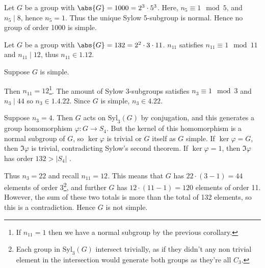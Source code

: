 \begin{example}
	Let $G$ be a group with $\abs{G} = 1000 = 2^3 \cdot 5^3$.
	Here, $n_5 \equiv 1 \mod 5$, and $n_5 \mid 8$, hence $n_5 = 1$.
	Thus the unique Sylow 5-subgroup is normal.
	Hence no group of order 1000 is simple.
\end{example}

\begin{example}
	Let $G$ be a group with $\abs{G} = 132 = 2^2 \cdot 3 \cdot 11$.
	$n_{11}$ satisfies $n_{11} \equiv 1 \mod 11$ and $n_{11} \mid 12$, thus $n_{11} \in \qty{1, 12}$.

	Suppose $G$ is simple.

	Then $n_{11} = 12$\footnote{If $n_{11} = 1$ then we have a normal subgroup by the previous corollary.}.
	The amount of Sylow 3-subgroups satisfies $n_3 \equiv 1 \mod 3$ and $n_3 \mid 44$ so $n_3 \in \qty{1, 4, 22}$.
	Since $G$ is simple, $n_3 \in \qty{4, 22}$.

	Suppose $n_3 = 4$.
	Then $G$ acts on $\mathrm{Syl}_3(G)$ by conjugation, and this generates a group homomorphism $\varphi : G \to S_4$.
	But the kernel of this homomorphism is a normal subgroup of $G$, so $\ker \varphi$ is trivial or $G$ itself as $G$ simple.
	If $\ker \varphi = G$, then $\Im \varphi$ is trivial, contradicting Sylow's second theorem.
	If $\ker \varphi = 1$, then $\Im \varphi$ has order $132 > |S_4|$ \Lightning.

	Thus $n_3 = 22$ and recall $n_{11} = 12$.
	This means that $G$ has $22 \cdot (3-1) = 44$ elements of order 3\footnote{Each group in $\mathrm{Syl}_3(G)$ intersect trivially, as if they didn't any non trivial element in the intersection would generate both groups as they're all $C_3$.}, and further $G$ has $12 \cdot (11 - 1) = 120$ elements of order 11.
	However, the sum of these two totals is more than the total of 132 elements, so this is a contradiction.
	Hence $G$ is not simple.
\end{example}
